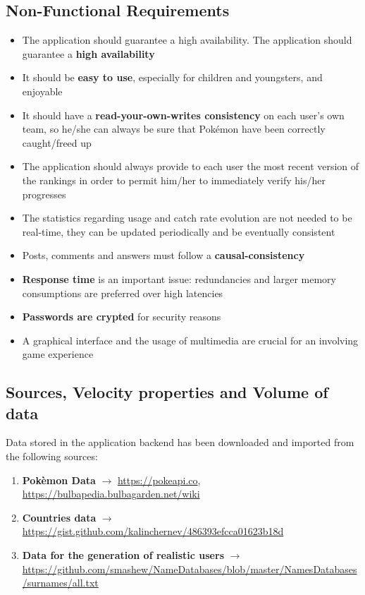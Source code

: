 \subsection{Non-Functional Requirements}
\begin{itemize}
	\item The application should guarantee a high availability. The application should guarantee a \textbf{high availability}
	\item It should be \textbf{easy to use}, especially for children and youngsters, and enjoyable
	\item It should have a \textbf{read-your-own-writes consistency} on each user’s own team, so he/she can always be sure that Pokémon have been correctly caught/freed up
	\item \colorbox{BurntOrange}{The application should always provide to each user} the most recent version of the rankings in order to permit him/her to immediately verify his/her progresses
	\item The statistics regarding usage and catch rate evolution are not needed to be real-time, they can be updated periodically and be eventually consistent
	\item Posts, comments and answers must follow a \textbf{causal-consistency}
	\item \textbf{Response time} is an important issue: redundancies and larger memory consumptions are preferred over high latencies
	\item \textbf{Passwords are crypted} for security reasons
	\item A graphical interface and the usage of multimedia are crucial for an involving game experience 
\end{itemize}
\subsection{Sources, Velocity properties and Volume of data}
Data stored in the application backend has been downloaded and imported from the following sources:
\begin{enumerate}
	\item \textbf{Pokèmon Data} $\rightarrow$ \url{https://pokeapi.co},\\ \url{https://bulbapedia.bulbagarden.net/wiki} 
	\item \textbf{Countries data} $\rightarrow$ \url{https://gist.github.com/kalinchernev/486393efcca01623b18d}
	\item \textbf{Data for the generation of realistic users} $\rightarrow$  \url{https://github.com/smashew/NameDatabases/blob/master/NamesDatabases/surnames/all.txt}
\end{enumerate}


